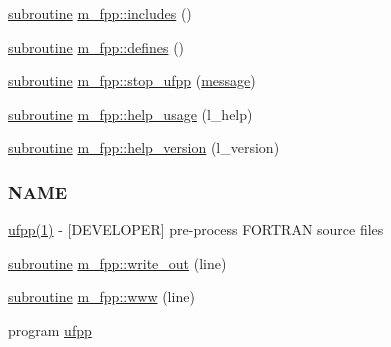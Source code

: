 \begin{DoxyCompactItemize}
\hyperlink{M__stopwatch_83_8txt_acfbcff50169d691ff02d4a123ed70482}{subroutine} \hyperlink{namespacem__fpp_ae2377b0a62c6cfcf80593df3126cd45f}{m\+\_\+fpp\+::includes} ()
\item 
\hyperlink{M__stopwatch_83_8txt_acfbcff50169d691ff02d4a123ed70482}{subroutine} \hyperlink{namespacem__fpp_a1db94413ac57479277fa9a5528ea3c26}{m\+\_\+fpp\+::defines} ()
\item 
\hyperlink{M__stopwatch_83_8txt_acfbcff50169d691ff02d4a123ed70482}{subroutine} \hyperlink{namespacem__fpp_a0cff320eaa7ee0c4ed98a6ecb9ecee0b}{m\+\_\+fpp\+::stop\+\_\+ufpp} (\hyperlink{M__stopwatch_83_8txt_aa4313e9a55405841f95e6550cd87fc3b}{message})
\item 
\hyperlink{M__stopwatch_83_8txt_acfbcff50169d691ff02d4a123ed70482}{subroutine} \hyperlink{namespacem__fpp_a17c5179799e6700fe39fb3bd2ec85d01}{m\+\_\+fpp\+::help\+\_\+usage} (l\+\_\+help)
\item 
\hyperlink{M__stopwatch_83_8txt_acfbcff50169d691ff02d4a123ed70482}{subroutine} \hyperlink{namespacem__fpp_a7a571f61ee26c2a637c1530d2271ab23}{m\+\_\+fpp\+::help\+\_\+version} (l\+\_\+version)
\begin{DoxyCompactList}\small\item\em \subsubsection*{N\+A\+ME}

\hyperlink{ufpp__overview_81_8txt_a97c20a96bcab81bc74c9d64b001f1202}{ufpp(1)} -\/ \mbox{[}D\+E\+V\+E\+L\+O\+P\+ER\mbox{]} pre-\/process F\+O\+R\+T\+R\+AN source files \end{DoxyCompactList}\item 
\hyperlink{M__stopwatch_83_8txt_acfbcff50169d691ff02d4a123ed70482}{subroutine} \hyperlink{namespacem__fpp_a945cf0930719327ca5ee9a866c11dc7a}{m\+\_\+fpp\+::write\+\_\+out} (line)
\item 
\hyperlink{M__stopwatch_83_8txt_acfbcff50169d691ff02d4a123ed70482}{subroutine} \hyperlink{namespacem__fpp_ac474947a9f75959822fccd4d82a05258}{m\+\_\+fpp\+::www} (line)
\item 
program \hyperlink{ufpp_8f90_ae38e75311f766ddb27e1389ad1e8f7cc}{ufpp}
\end{DoxyCompactItemize}
